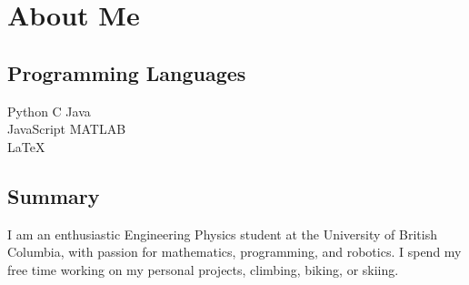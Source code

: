 \documentclass[]{deedy-resume-openfont}
\begin{document}
\section{About Me}
\begin{minipage}[t]{.35\textwidth}
	\subsection{Programming Languages}
	Python \textbullet{} C \textbullet{} Java \\
	JavaScript \textbullet{} MATLAB \\
	\LaTeX
	\sectionsep
\end{minipage}
\hfill
\begin{minipage}[t]{.55\textwidth}
	\subsection{Summary}
	I am an enthusiastic Engineering Physics student at the University of British Columbia, with passion for mathematics, programming, and robotics. I spend my free time working on my personal projects, climbing, biking, or skiing.
	\vspace{5pt}
\end{minipage}
\end{document}
